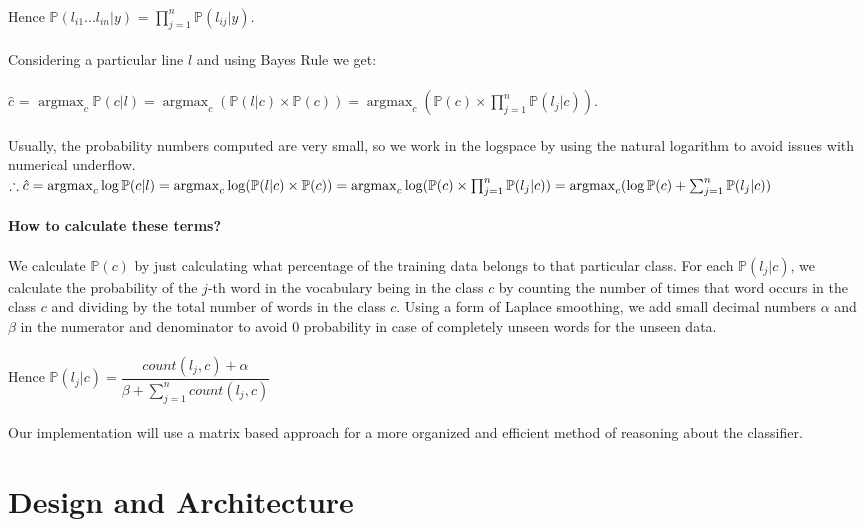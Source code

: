 \documentclass[12pt]{scrreprt}
\DeclareMathOperator*{\argmax}{argmax} %
\newcommand{\pr}{\mathbb{P}}
\begin{document}
\\ Hence $\mathbb{P}(l_{i1}...l_{in} | y)$ = $\prod_{j=1}^{n} \mathbb{P}(l_{ij} | y)$. \\
\\ Considering a particular line $l$ and using Bayes Rule we get:\\
\\  $\hat{c}$ = $ \argmax_c \pr(c | l) = \argmax_c ( \pr(l | c) \times \pr(c) )  = \argmax_c ( \pr(c) \times \prod_{j=1}^{n} \mathbb{P}(l_{j} | c) )$.\\
\\ Usually, the probability numbers computed are very small, so we work in the logspace by using the natural logarithm to avoid issues with numerical underflow.\\

$\therefore \hat{c} =  \argmax_c \log \pr(c | l) = \argmax_c \log( \pr(l | c) \times \pr(c)) = \argmax_c  \log (\pr(c) \times \prod_{j=1}^{n} \mathbb{P}(l_{j} | c) ) \\
\\ = \argmax_c (\log \pr(c) + \sum_{j=1}^{n} \pr(l_{j} | c)) $\\
\\ \textbf{How to calculate these terms?}\\
\\ We calculate $\pr(c)$ by just calculating what percentage of the training data belongs to that particular class. For each $\pr(l_j|c)$, we calculate the probability of the $j$-th word in the vocabulary being in the class $c$ by counting the number of times that word occurs in the class $c$ and dividing by the total number of words in the class $c$. Using a form of Laplace smoothing, we add small decimal numbers $\alpha$ and $\beta$ in the numerator and denominator to avoid 0 probability in case of completely unseen words for the unseen data.\\
\\ Hence $\pr(l_j|c) = \dfrac{count(l_j, c) + \alpha}{\beta + \sum_{j=1}^{n} count(l_j, c)}$ \\ 
\\ Our implementation will use a matrix based approach for a more organized and efficient method of reasoning about the classifier.







\chapter{Design and Architecture}
\end{document}
